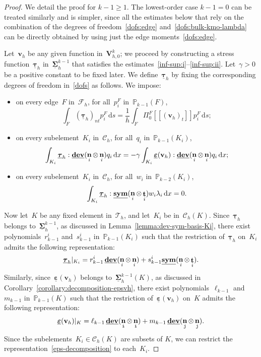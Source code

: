 \documentclass[a4paper,twoside,10pt]{article}
\theoremstyle{plain}
\theoremstyle{remark}
\theoremstyle{definition}
\numberwithin{equation}{section}
\numberwithin{figure}{section}
\newcommand{\jump}[1]{\left[\!\left[#1\right]\!\right]}
\newcommand{\Pbbkmo}{\mathbb{P}_{k-1}}
\newcommand{\Pbbkmt}{\mathbb{P}_{k-2}}
\newcommand{\Ccalh}{\mathcal{C}_h}
\newcommand{\Tauh}{\mathcal{T}_h}
\newcommand{\K}{K}
\newcommand{\F}{F}
\newcommand{\Sigmah}{\underline{\boldsymbol{\Sigma}}_h}
\newcommand{\Sigmahkmo}{\Sigmah^{k-1}}
\newcommand{\Vhkz}{\Vbf_{h,0}^k}
\newcommand{\taubfh}{\underline{\boldsymbol{\tau}}_h}
\newcommand{\vbfh}{\mathbf{v}_h}
\DeclareMathOperator{\dev}{\underline{\mathbf{dev}}}
\newcommand{\normtang}{{nt}}
\newcommand{\sym}{\underline{\bf{sym}}}
\DeclareMathOperator{\norm}{\bf{n}}
\DeclareMathOperator{\tang}{\bf{t}}
\newcommand{\tangscalar}{t}
\newcommand{\Fcalh}{\mathcal{F}_h}
\newcommand{\dx}{\, \mathrm{d}x}
\newcommand{\ds}{\, \mathrm{d}s}
\newcommand{\epsbfun}{\underline{\boldsymbol{\varepsilon}}}
\newcommand{\CcalhK}{\Ccalh(\K)}
\newcommand{\lambdai}{\lambda_i}
\newcommand{\rkmoi}{r_{k-1}^i}
\newcommand{\skmoi}{s_{k-1}^i}
\newcommand{\lkmo}{\ell_{k-1}}
\newcommand{\mkmo}{m_{k-1}}
\newcommand{\Ki}{{\K_i}}
\newcommand{\itt}{\mathtt{i}}
\newcommand{\jtt}{\mathtt{j}}
\newcommand{\normi}{\norm_i}
\newcommand{\tangi}{\tang_i}
\newcommand{\normitt}{\norm_{\itt}}
\newcommand{\normjtt}{\norm_{\jtt}}
\newcommand{\PizF}{\Pi_0^{\F}}
\newcommand{\Vbf}{\mathbf{V}}
\newcommand{\piF}{p_{i}^F}
\newcommand{\qi}{q_{i}}
\newcommand{\wi}{w_i}
\begin{document}
\begin{proof}
We detail the proof for $k-1 \geq 1$.
The lowest-order case $k-1 = 0$ can be treated similarly
and is simpler,
since all the estimates below that rely on the combination of
the degrees of freedom~\eqref{dofs:edge} and~\eqref{dofs:bulk-kmo-lambda}
can be directly obtained by using just the edge moments~\eqref{dofs:edge}.

Let~$\vbfh$ be any given function in~$\Vhkz$;
we proceed by constructing a stress function~$\taubfh$ in~$\Sigmahkmo$
that satisfies the estimates~\eqref{inf-sup:i}--\eqref{inf-sup:ii}.
Let~$\gamma > 0$ be a positive constant to be fixed later.
We define~$\taubfh$
by fixing the corresponding degrees of freedom in~\eqref{dofs} as follows.
We impose:
\begin{itemize}
\item on every edge~$\F$ in~$\Fcalh$, for all~$\piF$ in~$\Pbbkmo(\F)$,
\begin{equation}  \label{stability-dofs:1}
\int_{\F} (\taubfh)_{\normtang} \piF \ds = \frac{1}{h} \int_{\F} \PizF\jump{(\vbfh)_{\tangscalar}}\piF \ds;
\end{equation}
\item on every subelement~$\Ki$ in~$\Ccalh$, for all~$\qi$ in~$\Pbbkmo(\Ki)$,
\begin{equation} \label{stability-dofs:2}
\int_{\Ki} \taubfh : \dev(\normi\otimes\normi) \qi \dx = - \gamma\int_{\Ki} \epsbfun(\vbfh) : \dev(\normi\otimes\normi) \qi \dx;
\end{equation}
\item on every subelement~$\Ki$ in~$\Ccalh$, for all~$\wi$ in~$\Pbbkmt(\Ki)$,
\begin{equation} \label{stability-dofs:3}
\int_{\Ki} \taubfh : \sym(\normi\otimes\tangi)\wi\lambdai \dx = 0.
\end{equation}
\end{itemize}
Now let~$\K$ be any fixed element in~$\Tauh$,
and let~$\Ki$ be in~$\CcalhK$.
Since~$\taubfh$ belongs to~$\Sigmahkmo$,
as discussed in Lemma~\ref{lemma:dev-sym-basis-Ki},
there exist polynomials~$\rkmoi$ and~$\skmoi$ in~$\Pbbkmo(\Ki)$
such that the restriction of~$\taubfh$ on~$\Ki$
admits the following representation:
\begin{equation} \label{tau-decomposition}
\taubfh|_{\Ki} = \rkmoi\dev(\normi\otimes\normi) + \skmoi\sym(\normi\otimes\tangi).
\end{equation} 
Similarly,
since~$\epsbfun(\vbfh)$ belongs to~$\Sigmahkmo(\K)$,
as discussed in Corollary~\ref{corollary:decomposition-epsvh},
there exist polynomials~$\lkmo$ and $\mkmo$ in~$\Pbbkmo(\K)$
such that the restriction of~$\epsbfun(\vbfh)$ on~$\K$
admits the following representation:
\begin{equation} \label{eps-decomposition}
\epsbfun(\vbfh)|_{\K} = \lkmo\dev(\normitt\otimes\normitt) + \mkmo\dev(\normjtt\otimes\normjtt).
\end{equation}
Since the subelements~$\Ki \in \CcalhK$ are subsets of $\K$,
we can restrict the representation~\eqref{eps-decomposition}
to each~$\Ki$.


\end{proof}
\end{document}
